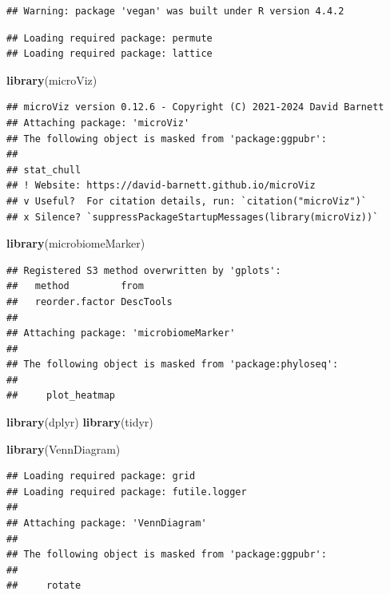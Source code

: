 \documentclass[
]{article}
\newenvironment{Shaded}{\begin{snugshade}}{\end{snugshade}}
\newcommand{\FunctionTok}[1]{\textcolor[rgb]{0.13,0.29,0.53}{\textbf{#1}}}
\newcommand{\NormalTok}[1]{#1}
\begin{document}
\begin{verbatim}
## Warning: package 'vegan' was built under R version 4.4.2
\end{verbatim}

\begin{verbatim}
## Loading required package: permute
## Loading required package: lattice
\end{verbatim}

\begin{Shaded}
\begin{Highlighting}[]
\FunctionTok{library}\NormalTok{(microViz)}
\end{Highlighting}
\end{Shaded}

\begin{verbatim}
## microViz version 0.12.6 - Copyright (C) 2021-2024 David Barnett
## Attaching package: 'microViz'
## The following object is masked from 'package:ggpubr':
## 
## stat_chull
## ! Website: https://david-barnett.github.io/microViz
## v Useful?  For citation details, run: `citation("microViz")`
## x Silence? `suppressPackageStartupMessages(library(microViz))`
\end{verbatim}

\begin{Shaded}
\begin{Highlighting}[]
\FunctionTok{library}\NormalTok{(microbiomeMarker)}
\end{Highlighting}
\end{Shaded}

\begin{verbatim}
## Registered S3 method overwritten by 'gplots':
##   method         from     
##   reorder.factor DescTools
## 
## Attaching package: 'microbiomeMarker'
## 
## The following object is masked from 'package:phyloseq':
## 
##     plot_heatmap
\end{verbatim}

\begin{Shaded}
\begin{Highlighting}[]
\FunctionTok{library}\NormalTok{(dplyr)}
\FunctionTok{library}\NormalTok{(tidyr)}

\FunctionTok{library}\NormalTok{(VennDiagram)}
\end{Highlighting}
\end{Shaded}

\begin{verbatim}
## Loading required package: grid
## Loading required package: futile.logger
## 
## Attaching package: 'VennDiagram'
## 
## The following object is masked from 'package:ggpubr':
## 
##     rotate
\end{verbatim}
\end{document}

